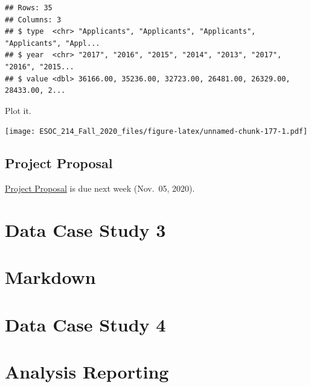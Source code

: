 \documentclass[
]{book}
\newenvironment{Shaded}{\begin{snugshade}}{\end{snugshade}}
\newcommand{\DataTypeTok}[1]{\textcolor[rgb]{0.13,0.29,0.53}{#1}}
\newcommand{\KeywordTok}[1]{\textcolor[rgb]{0.13,0.29,0.53}{\textbf{#1}}}
\newcommand{\NormalTok}[1]{#1}
\newcommand{\OperatorTok}[1]{\textcolor[rgb]{0.81,0.36,0.00}{\textbf{#1}}}
\newcommand{\OtherTok}[1]{\textcolor[rgb]{0.56,0.35,0.01}{#1}}
\newcommand{\StringTok}[1]{\textcolor[rgb]{0.31,0.60,0.02}{#1}}
\begin{document}
\begin{verbatim}
## Rows: 35
## Columns: 3
## $ type  <chr> "Applicants", "Applicants", "Applicants", "Applicants", "Appl...
## $ year  <chr> "2017", "2016", "2015", "2014", "2013", "2017", "2016", "2015...
## $ value <dbl> 36166.00, 35236.00, 32723.00, 26481.00, 26329.00, 28433.00, 2...
\end{verbatim}

Plot it.

\begin{Shaded}
\end{Shaded}

\texttt{[image: ESOC\_214\_Fall\_2020\_files/figure-latex/unnamed-chunk-177-1.pdf]}

\hypertarget{project-proposal}{%
\section{Project Proposal}\label{project-proposal}}

\href{final_project_docs/esoc214_project_proposal.pdf}{Project Proposal} is due next week (Nov.~05, 2020).

\hypertarget{data-case-study-3}{%
\chapter{Data Case Study 3}\label{data-case-study-3}}

\hypertarget{markdown}{%
\chapter{Markdown}\label{markdown}}

\hypertarget{data-case-study-4}{%
\chapter{Data Case Study 4}\label{data-case-study-4}}

\hypertarget{analysis-reporting}{%
\chapter{Analysis Reporting}\label{analysis-reporting}}

  
\end{document}
